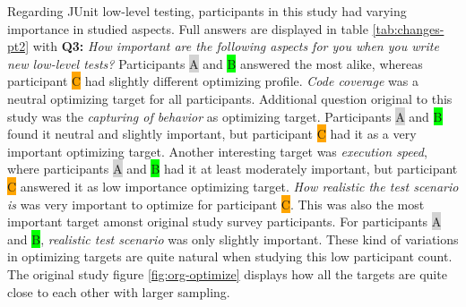 Regarding JUnit low-level testing, participants in this study had varying importance in studied aspects. Full answers are
displayed in table \ref{tab:changes-pt2} with \textbf{Q3:} \textit{How important are the following aspects for you when you write new low-level tests?}
Participants {\colorbox{lightgray}A} and {\colorbox{lime}B} answered
the most alike, whereas participant {\colorbox{orange}C} had slightly different optimizing profile. \textit{Code coverage}
was a neutral optimizing target for all participants. Additional question original to this study was the \textit{capturing of behavior}
as optimizing target. Participants {\colorbox{lightgray}A} and {\colorbox{lime}B} found it neutral and slightly important,
but participant {\colorbox{orange}C} had it as a very important optimizing target. Another interesting target was \textit{execution speed},
where participants {\colorbox{lightgray}A} and {\colorbox{lime}B} had it at least moderately important, but participant {\colorbox{orange}C}
answered it as low importance optimizing target. \textit{How realistic the test scenario is} was very important to optimize for
participant {\colorbox{orange}C}. This was also the most important target amonst original study survey participants.
For participants {\colorbox{lightgray}A} and {\colorbox{lime}B}, \textit{realistic test scenario} was only slightly important.
These kind of variations in optimizing targets are quite natural when studying this low participant count. The original study
figure \ref{fig:org-optimize} displays how all the targets are quite close to each other with larger sampling.

